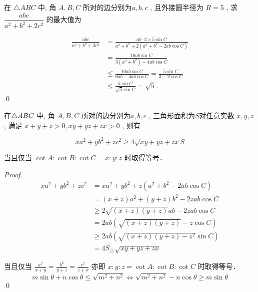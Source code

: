\begin{example}
    在 $ \triangle A B C$  中, 角 $ A, B, C$  所对的边分别为$  a, b, c $ , 
    且外接圆半径为 $ R=5 $ , 求$ \dfrac{a b c}{a^{2}+b^{2}+2 c^{2}} $ 的最大值为   
\end{example}

\begin{jie}
    \[
\begin{aligned}
    \frac{abc}{a^2 + b^2 + 2c^2} &= \frac{ab \cdot 2 \times 5 \sin C}{a^2 + b^2 + 2(a^2 + b^2 - 2ab \cos C)}\\
                                & = \frac{10ab \sin C}{3(a^2 + b^2) - 4ab \cos C}\\
                               &  \leq \frac{10ab \sin C}{6ab - 4ab \cos C} = \frac{5 \sin C}{3 - 2 \cos C} \\
                               &\leq \frac{5 \sin C}{\sqrt{5} \sin C} = \sqrt{5}.
\end{aligned}
\]
\qed
\end{jie}
\begin{theorem}[Weisenböck不等式]
    在\(\triangle ABC\) 中, 角 $ A, B, C$  所对的边分别为$  a, b, c $ , 三角形面积为\(S\)对任意实数 $ x, y, z $ , 满足 $ x+y+z>0,  x y+y z+z x>0$  , 则有

$$x a^{2}+y b^{2}+z c^{2} \geqslant 4 \sqrt{x y+y z+z x} S$$


当且仅当 $ \cot A: \cot B: \cot C=x: y: z$  时取得等号．
\end{theorem}
\begin{proof}
    \[\begin{aligned}
        x a^{2}+y b^{2}+z c^{2} & =x a^{2}+y b^{2}+z\left(a^{2}+b^{2}-2 a b \cos C\right) \\
        & =(x+z) a^{2}+(y+z) b^{2}-2 z a b \cos C \\
        & \geqslant 2 \sqrt{(x+z)(y+z)} a b-2 z a b \cos C \\
        & =2 a b(\sqrt{(x+z)(y+z)}-z \cos C) \\
        & \geqslant 2 a b\left(\sqrt{(x+z)(y+z)-z^{2}} \sin C\right) \\
        & =4 S_{\triangle} \sqrt{x y+y z+z x}
        \end{aligned}\]

        当且仅当 $ \frac{a^{2}}{x+y}=\frac{b^{2}}{y+z}=\frac{c^{2}}{z+x} $ 亦即 $ x: y: z=\cot A: \cot B: \cot C $ 时取得等号．
    \[m \sin \theta+n \cos \theta \leqslant \sqrt{m^{2}+n^{2}} \Longleftrightarrow \sqrt{m^{2}+n^{2}}-n \cos \theta \geqslant m \sin \theta\]
        \qed
\end{proof}
\clearpage
\review
\clearpage

